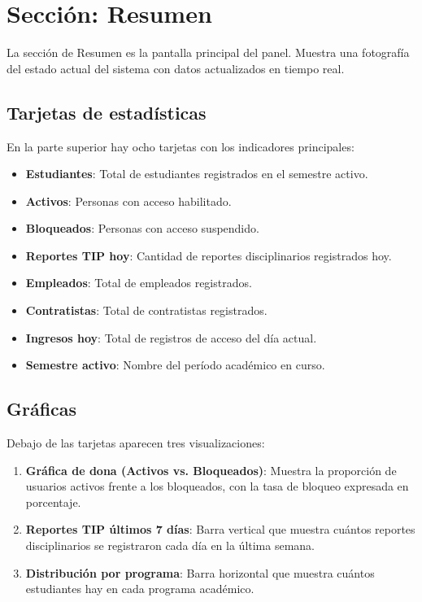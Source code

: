 \documentclass[12pt, a4paper]{article}
\begin{document}
\section{Sección: Resumen}
\label{sec:resumen}

La sección de Resumen es la pantalla principal del panel. Muestra
una fotografía del estado actual del sistema con datos actualizados
en tiempo real.

\subsection{Tarjetas de estadísticas}

En la parte superior hay ocho tarjetas con los indicadores principales:

\begin{itemize}
  \item \textbf{Estudiantes}: Total de estudiantes registrados en el semestre activo.
  \item \textbf{Activos}: Personas con acceso habilitado.
  \item \textbf{Bloqueados}: Personas con acceso suspendido.
  \item \textbf{Reportes TIP hoy}: Cantidad de reportes disciplinarios registrados hoy.
  \item \textbf{Empleados}: Total de empleados registrados.
  \item \textbf{Contratistas}: Total de contratistas registrados.
  \item \textbf{Ingresos hoy}: Total de registros de acceso del día actual.
  \item \textbf{Semestre activo}: Nombre del período académico en curso.
\end{itemize}

\subsection{Gráficas}

Debajo de las tarjetas aparecen tres visualizaciones:

\begin{enumerate}
  \item \textbf{Gráfica de dona (Activos vs. Bloqueados)}: Muestra la
        proporción de usuarios activos frente a los bloqueados, con la
        tasa de bloqueo expresada en porcentaje.

  \item \textbf{Reportes TIP últimos 7 días}: Barra vertical que muestra
        cuántos reportes disciplinarios se registraron cada día en la
        última semana.

  \item \textbf{Distribución por programa}: Barra horizontal que muestra
        cuántos estudiantes hay en cada programa académico.
\end{enumerate}
\end{document}
